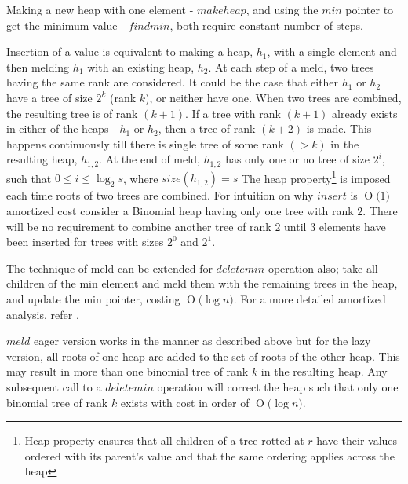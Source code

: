 \documentclass{llncs}
\newcommand{\BigO}[1]{\ensuremath{\operatorname{O}\bigl(#1\bigr)}}
\begin{document}
Making a new heap with one element - $makeheap$, and using the $min$ pointer to get the minimum value - $findmin$, both require constant number of steps. 

Insertion of a value is equivalent to making a heap, $h_1$, with a single element and then melding $h_1$ with an existing heap, $h_2$. At each step of a meld, two trees having the same rank are considered. It could be the case that either $h_1$ or $h_2$ have a tree of size $2^k$ (rank $k$), or neither have one. When two trees are combined, the resulting tree is of rank $(k+1)$. If a tree with rank $(k+1)$ already exists in either of the heaps - $h_1$ or $h_2$, then a tree of rank $(k+2)$ is made. This happens continuously till there is single tree of some rank $(>k)$ in the resulting heap, $h_{1,2}$. At the end of meld, $h_{1,2}$ has only one or no tree of size $2^i$, such that $0\le i \le \log_2 s$, where $size(h_{1,2})=s$ The heap property\footnote{Heap property ensures that all children of a tree rotted at $r$ have their values ordered with its parent's value and that the same ordering applies across the heap} is imposed each time roots of two trees are combined. For intuition on why $insert$ is \BigO{1} amortized cost consider a Binomial heap having only one tree with rank $2$. There will be no requirement to combine another tree of rank $2$ until $3$ elements have been inserted for trees with sizes $2^0$ and $2^1$. 

The technique of meld can be extended for $deletemin$ operation also; take all children of the min element and meld them with the remaining trees in the heap, and update the min pointer, costing \BigO{\log n}. For a more detailed amortized analysis, refer \cite{kozen1992design}.

$meld$ eager version works in the manner as described above but for the lazy version, all roots of one heap are added to the set of roots of the other heap. This may result in more than one binomial tree of rank $k$ in the resulting heap. Any subsequent call to a $deletemin$ operation will correct the heap such that only one binomial tree of rank $k$ exists with cost in order of \BigO{\log n}.
\end{document}
